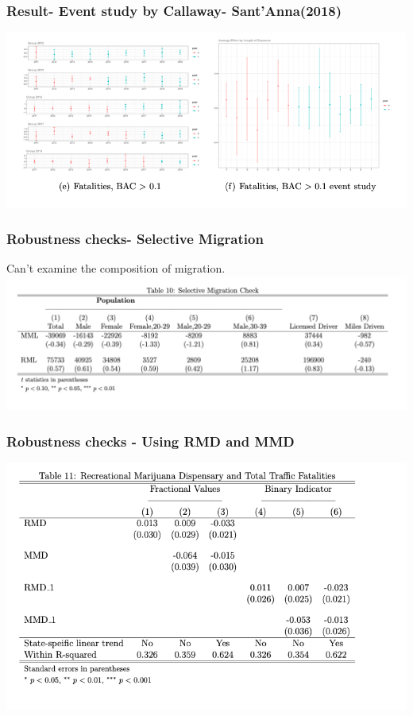 \documentclass{beamer}
\begin{document}
\begin{frame} %
\frametitle{Result- Event study by Callaway- Sant'Anna(2018)}
	
	\includegraphics[scale = 0.33]{event4}
	
\end{frame}







\begin{frame} %
\frametitle{Robustness checks- Selective Migration}
	Can't examine the composition of migration. 
	\includegraphics[scale = 0.33]{table10}
	
\end{frame}

\begin{frame} %
\frametitle{Robustness checks - Using RMD and MMD}
	
	\includegraphics[scale = 0.33]{table11}
	
\end{frame}
\end{document}
